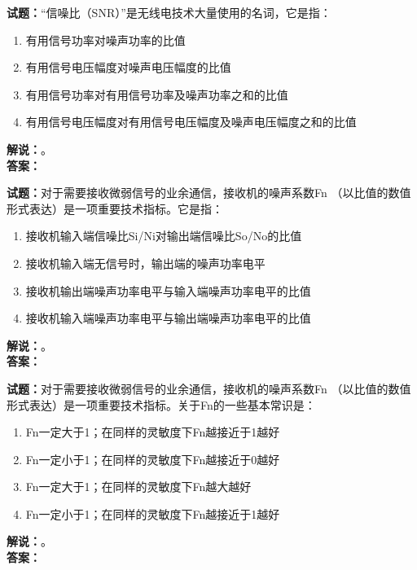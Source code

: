 \documentclass{ctexbook}
\begin{document}
\vspace{\baselineskip}

\noindent\textbf{试题：}“信噪比（SNR）”是无线电技术大量使用的名词，它是指：
\begin{enumerate}[leftmargin=3em]
  \item 有用信号功率对噪声功率的比值
  \item 有用信号电压幅度对噪声电压幅度的比值
  \item 有用信号功率对有用信号功率及噪声功率之和的比值
  \item 有用信号电压幅度对有用信号电压幅度及噪声电压幅度之和的比值
\end{enumerate}
\noindent\textbf{解说：}\textbf{}。\\\noindent\textbf{答案：}

\vspace{\baselineskip}

\noindent\textbf{试题：}对于需要接收微弱信号的业余通信，接收机的噪声系数Fn （以比值的数值形式表达）是一项重要技术指标。它是指：
\begin{enumerate}[leftmargin=3em]
  \item 接收机输入端信噪比Si/Ni对输出端信噪比So/No的比值
  \item 接收机输入端无信号时，输出端的噪声功率电平
  \item 接收机输出端噪声功率电平与输入端噪声功率电平的比值
  \item 接收机输入端噪声功率电平与输出端噪声功率电平的比值
\end{enumerate}
\noindent\textbf{解说：}\textbf{}。\\\noindent\textbf{答案：}

\vspace{\baselineskip}

\noindent\textbf{试题：}对于需要接收微弱信号的业余通信，接收机的噪声系数Fn （以比值的数值形式表达）是一项重要技术指标。关于Fn的一些基本常识是：
\begin{enumerate}[leftmargin=3em]
  \item Fn一定大于1；在同样的灵敏度下Fn越接近于1越好
  \item Fn一定小于1；在同样的灵敏度下Fn越接近于0越好
  \item Fn一定大于1；在同样的灵敏度下Fn越大越好
  \item Fn一定小于1；在同样的灵敏度下Fn越接近于1越好
\end{enumerate}
\noindent\textbf{解说：}\textbf{}。\\\noindent\textbf{答案：}

\vspace{\baselineskip}
\end{document}
